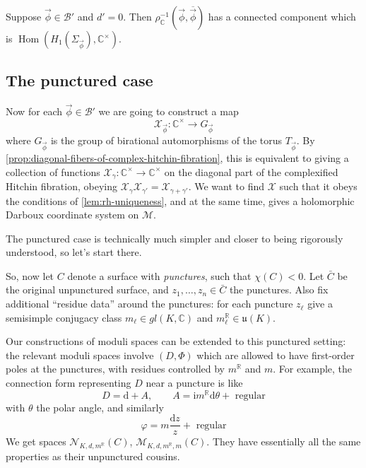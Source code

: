 \documentclass[12pt,letterpaper,reqno]{article}
\numberwithin{equation}{section}
\newcommand{\fu}{{\mathfrak u}}
\newcommand{\cB}{\ensuremath{\mathcal B}}
\newcommand{\cL}{\ensuremath{\mathcal L}}
\newcommand{\cM}{\ensuremath{\mathcal M}}
\newcommand{\cN}{\ensuremath{\mathcal N}}
\newcommand{\cX}{\ensuremath{\mathcal X}}
\newcommand{\R}{\ensuremath{\mathbb R}}
\newcommand{\C}{\ensuremath{\mathbb C}}
\newcommand{\I}{{\mathrm i}}
\newcommand{\de}{\mathrm{d}}
\newcommand{\ti}[1]{\textit{#1}}
\DeclareMathOperator{\Hom}{Hom}
\newcommand{\fixme}[1]{{\color{orange}{[#1]}}}
\begin{document}
\begin{prop} \label{prop:diagonal-fibers-of-complex-hitchin-fibration}
Suppose $\vec\phi \in \cB'$ and $d' = 0$. Then $\rho_\C^{-1}(\vec\phi, \overline{\vec\phi})$ has a
connected component which is $\Hom(H_1(\Sigma_{\vec\phi}),\C^\times)$. \fixme{I hope!}
\begin{pf}
\fixme{...}
\end{pf}
\end{prop}


\subsection{The punctured case}

Now for each $\vec\phi \in \cB'$ we are going to construct
a map
\begin{equation}
\cX_{\vec\phi}: \C^\times \to G_{\vec\phi}
\end{equation}
where $G_{\vec\phi}$ is the group of birational automorphisms
of the torus $T_{\vec\phi}$.
By \autoref{prop:diagonal-fibers-of-complex-hitchin-fibration},
this is equivalent to giving a collection of functions
$\cX_\gamma: \C^\times \to \C^\times$
on the diagonal part of the complexified Hitchin fibration,
obeying $\cX_{\gamma} \cX_{\gamma'} = \cX_{\gamma + \gamma'}$.
We want to find $\cX$ such that it obeys the conditions
of \autoref{lem:rh-uniqueness},
and at the same time, gives a holomorphic
Darboux coordinate system on $\cM$.

The punctured case is technically much simpler and closer to
being rigorously understood, so let's start there.

So, now let $C$ denote a surface with \ti{punctures}, such that
$\chi(C) < 0$. Let $\bar{C}$ be the original unpunctured surface,
and $z_1, \dots, z_n \in \bar{C}$ the punctures.
Also fix additional ``residue data'' around the punctures:
for each puncture $z_\ell$ give
a semisimple conjugacy class $m_\ell \in gl(K,\C)$
and $m_\ell^\R \in \fu(K)$.

Our constructions of moduli spaces can be extended to this
punctured setting: the relevant moduli spaces involve
$(D,\Phi)$ which are allowed to have first-order poles
at the punctures, with residues controlled by $m^\R$ and $m$.
For example, the connection form representing $D$ near
a puncture is like
\begin{equation}
  D = \de + A, \qquad A = \I m^\R \de \theta + \text{ regular}
\end{equation}
with $\theta$ the polar angle, and similarly
\begin{equation}
  \varphi = m \frac{\de z}{z} + \text{ regular}
\end{equation}
We get spaces $\cN_{K,d,m^\R}(C)$, $\cM_{K,d,m^\R,m}(C)$.
They have essentially all the same properties as
their unpunctured cousins. \fixme{expand this a lot!}
\end{document}
